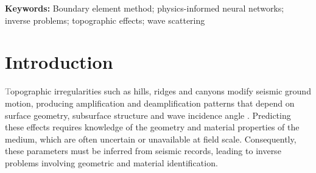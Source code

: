 \documentclass[11pt,twoside]{article}
\begin{document}
\begin{tcolorbox}[colback=gray!20, colframe=gray!20, sharp corners]

    \begin{abstract}

        \vspace{-1mm}

        \noindent
\noindent Topographic irregularities affect seismic ground motion. Predicting these effects requires knowledge of subsurface geometry and material properties, which are often unavailable at field scale and must be inferred from seismic records. This leads to ill-posed inverse problems. The boundary element method (BEM) is well suited to wave propagation in semi-infinite domains, while physics-informed neural networks (PINNs) offer advantages for inverse parameter estimation through automatic differentiation. However, BEM-based inversion requires repeated forward solutions, whereas PINNs face challenges in representing wave radiation in unbounded domains. In this work, we investigate the application of a hybrid BEM–PINN approach to inverse seismic problems in irregular topographies. Three scenarios are considered: identification of the hill–half-space interface, reconstruction of the free-surface geometry, and joint estimation of geometry and material properties.\\
    \end{abstract}
\end{tcolorbox} 

\noindent\textbf{Keywords:} Boundary element method; physics-informed neural networks; inverse problems; topographic effects; wave scattering


 
\section*{Introduction}\label{sec:introduction}

\lettrine[lines=2,loversize=0.15,findent=0.4em,nindent=0em]{\textcolor{gray}{T}}{}opographic irregularities such as hills, ridges and canyons modify seismic ground motion, producing amplification and deamplification patterns that depend on surface geometry, subsurface structure and wave incidence angle \citep{Bard1982,Kawase1988}. Predicting these effects requires knowledge of the geometry and material properties of the medium, which are often uncertain or unavailable at field scale. Consequently, these parameters must be inferred from seismic records, leading to inverse problems involving geometric and material identification.
\end{document}
